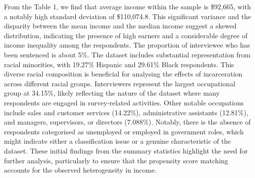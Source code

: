\documentclass{article}[12pt]
\begin{document}
From the Table 1, we find that average income within the sample is \$92,665, with a notably high standard deviation of \$110,074.8. This significant variance and the disparity between the mean income and the median income suggest a skewed distribution, indicating the presence of high earners and a considerable degree of income inequality among the respondents. The proportion of interviewee who has been sentenced is about 5\%. The dataset includes substantial representation from racial minorities, with 19.27\% Hispanic and 29.61\% Black respondents. This diverse racial composition is beneficial for analysing the effects of incarceration across different racial groups. Interviewers represent the largest occupational group at 34.15\%, likely reflecting the nature of the dataset where many respondents are engaged in survey-related activities. Other notable occupations include sales and customer services (14.22\%), administrative assistants (12.81\%), and managers, supervisors, or directors (7.088\%). Notably, there is the absence of respondents categorised as unemployed or employed in government roles, which might indicate either a classification issue or a genuine characteristic of the dataset. These initial findings from the summary statistics highlight the need for further analysis, particularly to ensure that the propensity score matching accounts for the observed heterogeneity in income. \par
\end{document}
